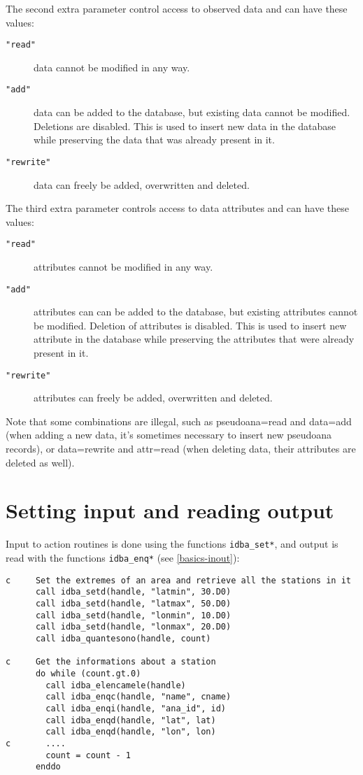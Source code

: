 \documentclass[final,12pt,a4paper,twoside]{book}
\begin{document}
The second extra parameter control access to observed data and can have
these values:

\begin{description}
\item[{\tt "read"}] data cannot be modified in any way.
\item[{\tt "add"}] data can be added to the database, but existing data cannot
		   be modified.  Deletions are disabled.  This is used to
		   insert new data in the database while preserving the data
		   that was already present in it.
\item[{\tt "rewrite"}] data can freely be added, overwritten and deleted.
\end{description}

The third extra parameter controls access to data attributes and can have
these values:

\begin{description}
\item[{\tt "read"}] attributes cannot be modified in any way.
\item[{\tt "add"}] attributes can can be added to the database, but existing
		   attributes cannot be modified.  Deletion of attributes is
		   disabled.  This is used to insert new attribute in the
		   database while preserving the attributes that were already
		   present in it.
\item[{\tt "rewrite"}] attributes can freely be added, overwritten and deleted.
\end{description}

Note that some combinations are illegal, such as pseudoana=read and data=add
(when adding a new data, it's sometimes necessary to insert new pseudoana
records), or data=rewrite and attr=read (when deleting data, their attributes
are deleted as well).


\section{Setting input and reading output}

Input to action routines is done using the functions {\tt idba\_set*}, and output
is read with the functions {\tt idba\_enq*} (see \ref{basics-inout}):

\begin{verbatim}
c     Set the extremes of an area and retrieve all the stations in it
      call idba_setd(handle, "latmin", 30.D0)
      call idba_setd(handle, "latmax", 50.D0)
      call idba_setd(handle, "lonmin", 10.D0)
      call idba_setd(handle, "lonmax", 20.D0)
      call idba_quantesono(handle, count)
   
c     Get the informations about a station
      do while (count.gt.0)
        call idba_elencamele(handle)
        call idba_enqc(handle, "name", cname)
        call idba_enqi(handle, "ana_id", id)
        call idba_enqd(handle, "lat", lat)
        call idba_enqd(handle, "lon", lon)
c       ....
        count = count - 1
      enddo
\end{verbatim}
\end{document}
